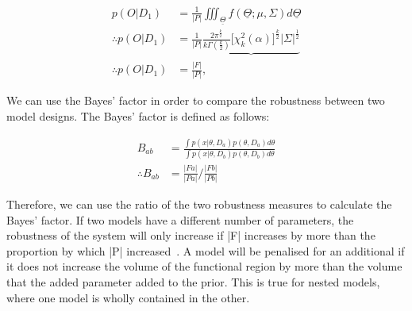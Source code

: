 \begin{align}
p(O|D_1) &= \frac{1}{|P|}\iiint_{\underline{\Theta}}f(\underline{\Theta};\mu,\Sigma)d\underline{\Theta} \\%
\therefore p(O|D_1) &= \frac{1}{|P|}\underbrace{\frac{2\pi^{\frac{k}{2}}}{k\Gamma(\frac{k}{2})} \Big[ \chi _{k}^{2}(\alpha) \Big]^{\frac{k}{2}} |\Sigma|^\frac{1}{2}} \\
\therefore p(O|D_1) &= \frac{|F|}{|P|},
\end{align}



\noindent We can use the Bayes' factor in order to compare the robustness between two model designs. The Bayes' factor is defined as follows:

\begin{align}
B_{ab} &= \frac{\displaystyle \int p(x|\theta, D_a)p(\theta, D_a)d\theta}{\displaystyle \int p(x|\theta, D_b)p(\theta, D_b)d\theta} \\
\therefore B_{ab} &= \frac{|Fa|}{|Pa|} / \frac{|Fb|}{|Pb|} \label{eq:final_bayes}
\end{align}

\noindent Therefore, we can use the ratio of the two robustness measures to calculate the Bayes' factor. If two models have a different number of parameters, the robustness of the system will only increase if |F| increases by more than the proportion by which |P| increased~\autocite{Woods:2016eh}. A model will be penalised for an additional if it does not increase the volume of the functional region by more than the volume that the added parameter added to the prior. This is true for nested models, where one model is wholly contained in the other. 




